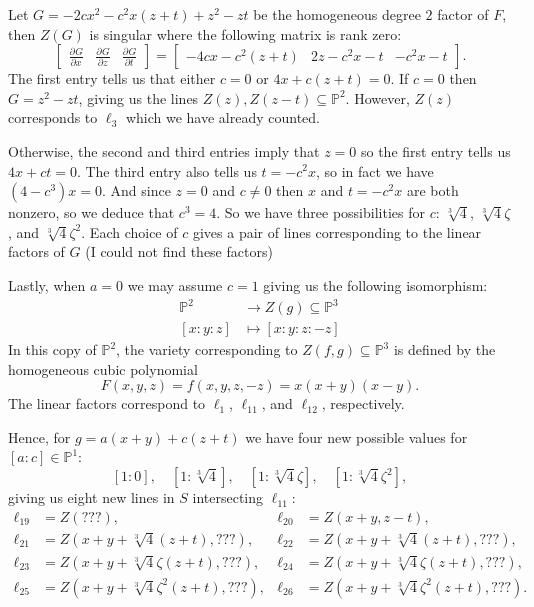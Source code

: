 \documentclass[12pt]{article}
\theoremstyle{definition}
\renewcommand{\P}{\mathbb{P}}
\newcommand{\<}{\langle}
\renewcommand{\>}{\rangle}
\newcommand{\mat}[1]{\begin{bmatrix}#1\end{bmatrix}}
\newcommand{\pdv}[3][]{\frac{\partial^{#1}#2}{\partial{#3}^{#1}}}
\begin{document}
Let $G = -2cx^2 - c^2x(z + t) + z^2 - zt$ be the homogeneous degree $2$ factor of $F$, then $Z(G)$ is singular where the following matrix is rank zero:
\[
    \mat{\pdv{G}{x} & \pdv{G}{z} & \pdv{G}{t}}
        = \mat{-4cx - c^2(z + t) & 2z - c^2x - t & -c^2x - t}.
\]
The first entry tells us that either $c = 0$ or $4x + c(z + t) = 0$.
If $c = 0$ then $G = z^2 - zt$, giving us the lines $Z(z), Z(z - t) \subseteq \P^2$.
However, $Z(z)$ corresponds to $\ell_3$ which we have already counted.

Otherwise, the second and third entries imply that $z = 0$ so the first entry tells us $4x + ct = 0$.
The third entry also tells us $t = -c^2x$, so in fact we have $(4 - c^3)x = 0$.
And since $z = 0$ and $c \ne 0$ then $x$ and $t = -c^2x$ are both nonzero, so we deduce that $c^3 = 4$.
So we have three possibilities for $c$: $\sqrt[3]{4}$, $\sqrt[3]{4}\zeta$, and $\sqrt[3]{4}\zeta^2$.
Each choice of $c$ gives a pair of lines corresponding to the linear factors of $G$ (I could not find these factors)

Lastly, when $a = 0$ we may assume $c = 1$ giving us the following isomorphism:
\begin{align*}
    \P^2 &\longrightarrow Z(g) \subseteq \P^3 \\
    [x : y : z] &\longmapsto [x : y : z : -z]
\end{align*}
In this copy of $\P^2$, the variety corresponding to $Z(f, g) \subseteq \P^3$ is defined by the homogeneous cubic polynomial
\[
    F(x, y, z)
        = f(x, y, z, -z)
        = x(x + y)(x - y).
\]
The linear factors correspond to $\ell_1$, $\ell_{11}$, and $\ell_{12}$, respectively.

Hence, for $g = a(x + y) + c(z + t)$ we have four new possible values for $[a : c] \in \P^1$:
\[
    [1 : 0], \quad [1 : \sqrt[3]{4}], \quad [1 : \sqrt[3]{4}\zeta], \quad [1 : \sqrt[3]{4}\zeta^2],
\]
giving us eight new lines in $S$ intersecting $\ell_{11}$:
\begin{align*}
    \ell_{19} &= Z(???), & \ell_{20} &= Z(x + y, z - t), \\
    \ell_{21} &= Z(x + y + \sqrt[3]{4}(z + t), ???), & \ell_{22} &= Z(x + y + \sqrt[3]{4}(z + t), ???), \\
    \ell_{23} &= Z(x + y + \sqrt[3]{4}\zeta(z + t), ???), & \ell_{24} &= Z(x + y + \sqrt[3]{4}\zeta(z + t), ???), \\
    \ell_{25} &= Z(x + y + \sqrt[3]{4}\zeta^2(z + t), ???), & \ell_{26} &= Z(x + y + \sqrt[3]{4}\zeta^2(z + t), ???).
\end{align*}
\end{document}
